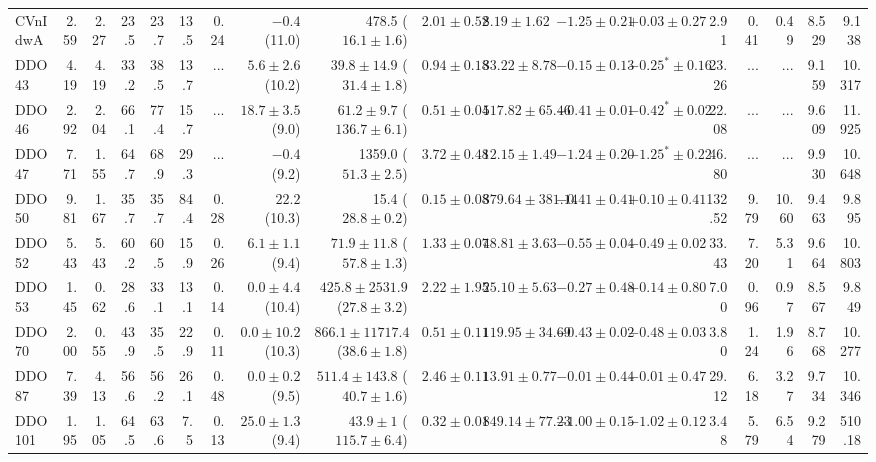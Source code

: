 \documentclass[natbib209]{emulateapj}
\begin{document}
\begin{table}
\begin{center}
{\begin{tabular}{@{}lrrrrrrrrrrrrrrrrr}
\hline
CVnIdwA			&   2.59	&   2.27 & 23.5 & 23.7	&  13.5 & 0.24  & $-0.4$ (11.0) & 478.5 ($16.1 \pm 1.6$) & $2.01 \pm 0.52$ & $8.19 \pm 1.62$							&$-1.25 \pm 0.21$		&$+0.03 \pm 0.27$	& 2.91 & 0.41 & 0.49 & 8.529 & 9.138 \\
DDO 43			&   4.19	&   4.19 & 33.2 & 38.5	&  13.7 & $...$ & $5.6 \pm 2.6$ (10.2) & $39.8 \pm 14.9$ ($31.4 \pm 1.8$) & $0.94 \pm 0.18$ & $33.22 \pm 8.78$			&$-0.15 \pm 0.13$		&$-0.25^{*} \pm 0.16$	& 23.26  & $...$ & $...$ & 9.159 & 10.317  \\ 
DDO 46			&   2.92	&   2.04 & 66.1 & 77.4	&  15.7 & $...$ & $18.7 \pm 3.5$ (9.0) & $61.2 \pm 9.7$ ($136.7 \pm 6.1$) & $0.51 \pm 0.04$ & $517.82 \pm 65.46$		&$-0.41 \pm 0.01$		&$-0.42^{*} \pm 0.02$	& 22.08  & $...$ & $...$ & 9.609 & 11.925  \\
DDO 47			&   7.71	&   1.55 & 64.7 & 68.9	&  29.3 & $...$ & $-0.4$ (9.2) & 1359.0 ($51.3 \pm 2.5$) & $3.72 \pm 0.48$ & $12.15 \pm 1.49$							&$-1.24 \pm 0.20$		&$-1.25^{*} \pm 0.22$	& 46.80 & $...$ & $...$ & 9.930 & 10.648  \\
DDO 50			&   9.81	&   1.67 & 35.7 & 35.7	&  84.4 & 0.28  & $22.2$ (10.3) & 15.4 ($28.8 \pm 0.2$) & $0.15 \pm 0.08$ & $379.64 \pm 381.14$							&$-0.41 \pm 0.41$		&$+0.10 \pm 0.41$	& 132.52 & 9.79 & 10.60 & 9.463 & 9.895 \\
DDO 52			&   5.43	&   5.43 & 60.2 & 60.5	&  15.9 & 0.26  & $6.1 \pm 1.1$ (9.4) & $71.9 \pm 11.8$ ($57.8 \pm 1.3$) & $1.33 \pm 0.07$ & $48.81 \pm 3.63$			&$-0.55 \pm 0.04$		&$-0.49 \pm 0.02$	& 33.43 & 7.20 & 5.31 & 9.664 & 10.803 \\
DDO 53			&   1.45	&   0.62 & 28.6 & 33.1	&  13.1 & 0.14  & $0.0 \pm 4.4$ (10.4) & $425.8 \pm 2531.9$ ($27.8 \pm 3.2$) & $2.22 \pm 1.95$ & $25.10 \pm 5.63$		&$-0.27 \pm 0.48$		&$+0.14 \pm 0.80$	& 7.00 & 0.96 & 0.97 & 8.567 & 9.849 \\
DDO 70			&	2.00	&	0.55 & 43.9 & 35.5	&  22.9 & 0.11  & $0.0 \pm 10.2$ (10.3) & $866.1 \pm 11717.4$ ($38.6 \pm 1.8$) & $0.51 \pm 0.11$ & $119.95 \pm 34.69$							&$-0.43 \pm 0.02$		&$-0.48 \pm 0.03$	& 3.80  & 1.24  & 1.96 & 8.768 & 10.277  \\
DDO 87			&   7.39	&   4.13 & 56.6 & 56.2	&  26.1 & 0.48  & $0.0 \pm 0.2$ (9.5) & $511.4 \pm 143.8$ ($40.7 \pm 1.6$) & $2.46 \pm 0.11$ & $13.91 \pm 0.77$			&$-0.01 \pm 0.44$		&$-0.01 \pm 0.47$	& 29.12 & 6.18 & 3.27 & 9.734 & 10.346 \\
DDO 101			&   1.95	&   1.05  & 64.5 & 63.6	&  7.5  & 0.13  & $25.0 \pm 1.3$ (9.4) & $43.9 \pm 1$ ($115.7 \pm 6.4$) & $0.32 \pm 0.01$ & $849.14 \pm 77.23$ &$-1.00 \pm 0.15$		&$-1.02 \pm 0.12$	& 3.48 & 5.79 & 6.54 & 9.279 &  510.18 \\

\end{tabular}}
\end{center}
\end{table}
\end{document}
